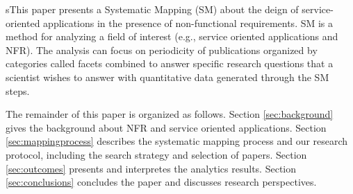 sThis paper presents a Systematic Mapping (SM)  \cite{Petersen:2008} 
about the deign of service-oriented applications in the presence of
non-functional requirements. SM is a  method for analyzing a field of interest (e.g., service oriented applications and NFR). The analysis can focus on
periodicity of publications organized by categories called facets combined to
answer  specific research questions  \cite{Budgen:2008}  that a scientist wishes to answer with quantitative data generated through the SM steps. 

The remainder of this paper is organized as follows. Section \ref{sec:background} gives
the background about NFR and service oriented applications. Section \ref{sec:mappingprocess}  describes the systematic mapping
process and our research protocol, including the search strategy and selection of papers. Section \ref{sec:outcomes} presents and interpretes the analytics results.
Section \ref{sec:conclusions} concludes the paper and discusses research perspectives. 
